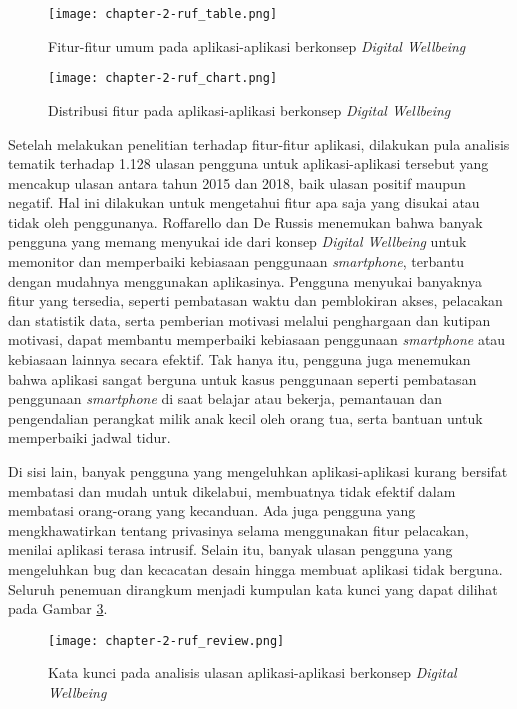 \begin{figure}[h]
  \centering
  \texttt{[image: chapter-2-ruf\_table.png]}
  \caption{Fitur-fitur umum pada aplikasi-aplikasi berkonsep \textit{Digital Wellbeing} \parencite{CHI2019SOCIALIZE}}
  \label{img:ruf_table}
\end{figure}

\begin{figure}[h]
  \centering
  \texttt{[image: chapter-2-ruf\_chart.png]}
  \caption{Distribusi fitur pada aplikasi-aplikasi berkonsep \textit{Digital Wellbeing} \parencite{CHI2019SOCIALIZE}}
  \label{img:ruf_chart}
\end{figure}

Setelah melakukan penelitian terhadap fitur-fitur aplikasi, dilakukan pula analisis tematik terhadap 1.128 ulasan pengguna untuk aplikasi-aplikasi tersebut yang mencakup ulasan antara tahun 2015 dan 2018, baik ulasan positif maupun negatif. Hal ini dilakukan untuk mengetahui fitur apa saja yang disukai atau tidak oleh penggunanya. Roffarello dan De Russis menemukan bahwa banyak pengguna yang memang menyukai ide dari konsep \textit{Digital Wellbeing} untuk memonitor dan memperbaiki kebiasaan penggunaan \textit{smartphone}, terbantu dengan mudahnya menggunakan aplikasinya. Pengguna menyukai banyaknya fitur yang tersedia, seperti pembatasan waktu dan pemblokiran akses, pelacakan dan statistik data, serta pemberian motivasi melalui penghargaan dan kutipan motivasi, dapat membantu memperbaiki kebiasaan penggunaan \textit{smartphone} atau kebiasaan lainnya secara efektif. Tak hanya itu, pengguna juga menemukan bahwa aplikasi sangat berguna untuk kasus penggunaan seperti pembatasan penggunaan \textit{smartphone} di saat belajar atau bekerja, pemantauan dan pengendalian perangkat milik anak kecil oleh orang tua, serta bantuan untuk memperbaiki jadwal tidur.

Di sisi lain, banyak pengguna yang mengeluhkan aplikasi-aplikasi kurang bersifat membatasi dan mudah untuk dikelabui, membuatnya tidak efektif dalam membatasi orang-orang yang kecanduan. Ada juga pengguna yang mengkhawatirkan tentang privasinya selama menggunakan fitur pelacakan, menilai aplikasi terasa intrusif. Selain itu, banyak ulasan pengguna yang mengeluhkan bug dan kecacatan desain hingga membuat aplikasi tidak berguna. Seluruh penemuan dirangkum menjadi kumpulan kata kunci yang dapat dilihat pada Gambar \ref{img:ruf_review}.

\begin{figure}[h]
  \centering
  \texttt{[image: chapter-2-ruf\_review.png]}
  \caption{Kata kunci pada analisis ulasan aplikasi-aplikasi berkonsep \textit{Digital Wellbeing} \parencite{CHI2019SOCIALIZE}}
  \label{img:ruf_review}
\end{figure}

